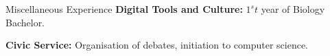 \begin{rubric}{Miscellaneous Experience}
\entry*[2025] \textbf{Digital Tools and Culture:} $1^st$ year of Biology Bachelor.

\entry*[2019] \textbf{Civic Service:} Organisation of debates, initiation to computer science.

\end{rubric}
